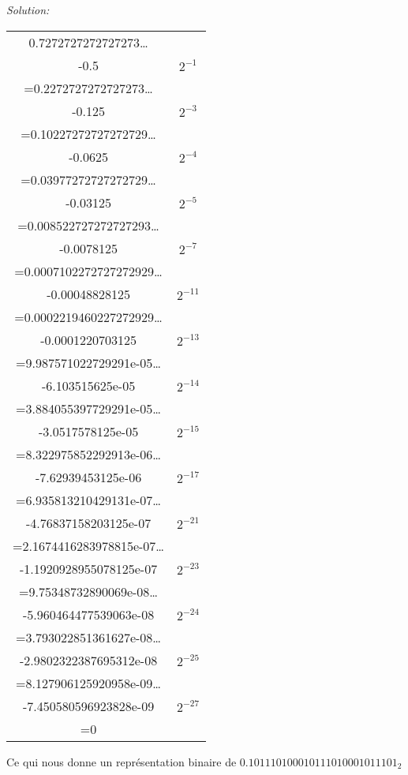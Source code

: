 \documentclass{article}
\newenvironment{solution}
    {\textit{Solution:}}
    {}
\begin{document}
\begin{solution}
    \begin{tabular}{|c|c|}
        \hline
        0.7272727272727273\dots \\
        -0.5 & $2^{-1}$\\
        \hline
        =0.2272727272727273\dots \\
        -0.125 & $2^{-3}$\\
        \hline
        =0.10227272727272729\dots \\
        -0.0625 & $2^{-4}$\\
        \hline
        =0.03977272727272729\dots \\
        -0.03125 & $2^{-5}$\\
        \hline
        =0.008522727272727293\dots \\
        -0.0078125 & $2^{-7}$\\
        \hline
        =0.0007102272727272929\dots \\
        -0.00048828125 & $2^{-11}$\\
        \hline
        =0.0002219460227272929\dots \\
        -0.0001220703125 & $2^{-13}$\\
        \hline
        =9.987571022729291e-05\dots \\
        -6.103515625e-05 & $2^{-14}$\\
        \hline
        =3.884055397729291e-05\dots \\
        -3.0517578125e-05 & $2^{-15}$\\
        \hline
        =8.322975852292913e-06\dots \\
        -7.62939453125e-06 & $2^{-17}$\\
        \hline
        =6.935813210429131e-07\dots \\
        -4.76837158203125e-07 & $2^{-21}$\\
        \hline
        =2.1674416283978815e-07\dots \\
        -1.1920928955078125e-07 & $2^{-23}$\\
        \hline
        =9.75348732890069e-08\dots \\
        -5.960464477539063e-08 & $2^{-24}$\\
        \hline
        =3.793022851361627e-08\dots \\
        -2.9802322387695312e-08 & $2^{-25}$\\
        \hline
        =8.127906125920958e-09\dots \\
        -7.450580596923828e-09 & $2^{-27}$\\
        \hline
        =0 & \\
        \hline
    \end{tabular}
    Ce qui nous donne un représentation binaire de $0.101110100010111010001011101_2$\\


\end{solution}
\end{document}
